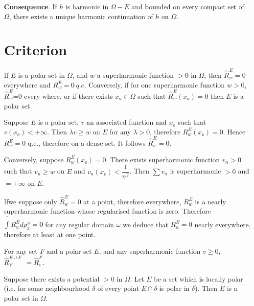 \noindent
\textbf{Consequence}. If $h$ is harmonic in $\Omega - E$ and bounded
on every compact set of $\Omega$, there exists a unique harmonic
continuation of $h$ on $\Omega$. 

\section{Criterion}\label{p4:chap7:sec33}%

\begin{thm}\label{p4:chap7:sec33:thm24}%
  If $E$ is a polar set in $\Omega$, and $w$ a superharmonic function
  $> 0$ in $\Omega$, then $\hat{R}^E_w = 0$ everywhere and $R^E_w = 0
  ~ q.e.$ Conversely, if for one superharmonic function $w > 0$,
  $\hat{R}^E_w$=0 
  every where, or if there exists $x_o \in \Omega$ such that
  $\hat{R}^E_w (x_o) = 0$ then $E$ is a polar set. 
\end{thm}
  
 Suppose $E$ is a polar set, $v$ an associated function and $x_o$ such
 that $v(x_o) < + \infty$. Then $\lambda v \ge w$ on $E$ for any
 $\lambda > 0$, therefore $R^E_w (x_o) = 0$. Hence $R^E_w = 0$ q.e.,
 therefore on a dense set. It follows $\hat{R}^E_w = 0$. 

Conversely, suppose $R^E_w(x_o) = 0$. There exists superharmonic
function $v_n > 0$ such that $v_n \ge w$ on $E$ and $v_n (x_o) <
\dfrac{1}{n^2}$. Then $\sum v_n$ is superharmonic $> 0$ and $ = +
\infty$ on $E$. 

If\pageoriginale we suppose only $\hat{R}^E_w = 0$ at  a point, therefore
everywhere, $R^E_w$ is a nearly superharmonic function whose
regularised function is zero. Therefore $\bar{\int} R^E_w d
\rho^\omega_x = 0$ for any regular domain $\omega$ we deduce that
$R^E_w = 0$ nearly everywhere, therefore at least at one point. 

\begin{coro*}
  For any set $F$ and a polar set $E$, and any superharmonic function
  $v \ge 0$, $\hat{R}^{E \cup F}_V ~ ~ = \hat{R}^F_v$. 
\end{coro*}

\begin{thm}\label{p4:chap7:sec33:thm25} %
  Suppose there exists a potential $> 0$ in $\Omega$. Let $E$ be a set
  which is locally polar (i.e. for some neighbourhood $\delta$ of every
  point $E \cap \delta$ is polar in $\delta$). Then $E$ is a polar set
  in $\Omega$. 
\end{thm}

